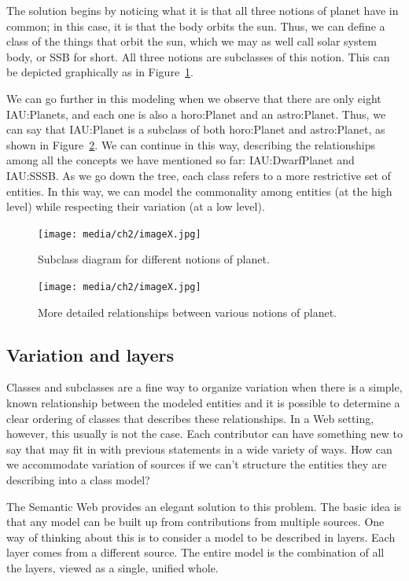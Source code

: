 The solution begins by noticing what it is that all three notions of
planet have in common; in this case, it is that the body orbits the sun.
Thus, we can define a class of the things that orbit the sun, which we
may as well call solar system body, or SSB for short. All three notions
are subclasses of this notion. This can be depicted graphically as in
Figure~\ref{fig:ch2.1}.

We can go further in this modeling when we observe that there are only
eight IAU:Planets, and each one is also a horo:Planet and an
astro:Planet. Thus, we can say that IAU:Planet is a subclass of both
horo:Planet and astro:Planet, as shown in Figure~\ref{fig:ch2.2}. We can continue in
this way, describing the relationships among all the concepts we have
mentioned so far: IAU:DwarfPlanet and IAU:SSSB. As we go down the tree,
each class refers to a more restrictive set of entities. In this way, we
can model the commonality among entities (at the high level) while
respecting their variation (at a low level).


\begin{figure}
    \centering
    \texttt{[image: media/ch2/imageX.jpg]}
    \caption{Subclass diagram for different notions of planet.}
    \label{fig:ch2.1}
\end{figure}


\begin{figure}
    \centering
    \texttt{[image: media/ch2/imageX.jpg]}
    \caption{More detailed relationships between various notions of planet.}
    \label{fig:ch2.2}
\end{figure}


\subsection{Variation and layers}

Classes and subclasses are a fine way to organize variation when there
is a simple, known relationship between the modeled entities and it is
possible to determine a clear ordering of classes that describes these
relationships. In a Web setting, however, this usually is not the case.
Each contributor can have something new to say that may fit in with
previous statements in a wide variety of ways. How can we accommodate
variation of sources if we can't structure the entities they are
describing into a class model?

The Semantic Web provides an elegant solution to this problem. The basic
idea is that any model can be built up from contributions from multiple
sources. One way of thinking about this is to consider a model to be
described in layers. Each layer comes from a different source. The
entire model is the combination of all the layers, viewed as a single,
unified whole.

